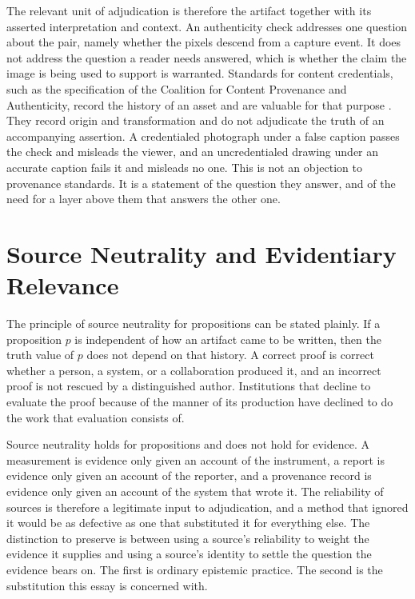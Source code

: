 \documentclass[12pt]{article}
\theoremstyle{definition}
\theoremstyle{remark}
\begin{document}
The relevant unit of adjudication is therefore the artifact together with its asserted interpretation and context. An authenticity check addresses one question about the pair, namely whether the pixels descend from a capture event. It does not address the question a reader needs answered, which is whether the claim the image is being used to support is warranted. Standards for content credentials, such as the specification of the Coalition for Content Provenance and Authenticity, record the history of an asset and are valuable for that purpose \cite{c2pa}. They record origin and transformation and do not adjudicate the truth of an accompanying assertion. A credentialed photograph under a false caption passes the check and misleads the viewer, and an uncredentialed drawing under an accurate caption fails it and misleads no one. This is not an objection to provenance standards. It is a statement of the question they answer, and of the need for a layer above them that answers the other one.

\section{Source Neutrality and Evidentiary Relevance}

The principle of source neutrality for propositions can be stated plainly. If a proposition $p$ is independent of how an artifact came to be written, then the truth value of $p$ does not depend on that history. A correct proof is correct whether a person, a system, or a collaboration produced it, and an incorrect proof is not rescued by a distinguished author. Institutions that decline to evaluate the proof because of the manner of its production have declined to do the work that evaluation consists of.

Source neutrality holds for propositions and does not hold for evidence. A measurement is evidence only given an account of the instrument, a report is evidence only given an account of the reporter, and a provenance record is evidence only given an account of the system that wrote it. The reliability of sources is therefore a legitimate input to adjudication, and a method that ignored it would be as defective as one that substituted it for everything else. The distinction to preserve is between using a source's reliability to weight the evidence it supplies and using a source's identity to settle the question the evidence bears on. The first is ordinary epistemic practice. The second is the substitution this essay is concerned with.
\end{document}
